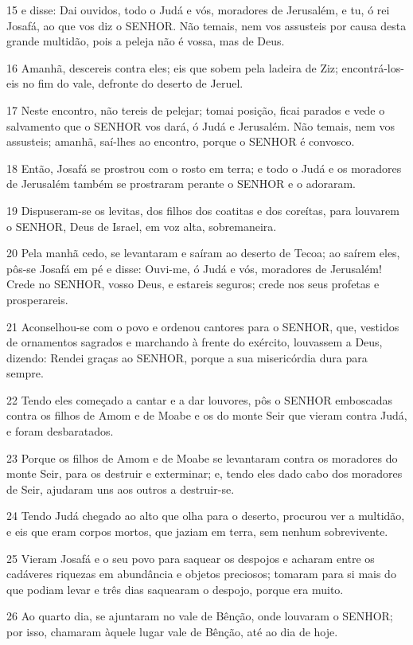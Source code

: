 \par 15 e disse: Dai ouvidos, todo o Judá e vós, moradores de Jerusalém, e tu, ó rei Josafá, ao que vos diz o SENHOR. Não temais, nem vos assusteis por causa desta grande multidão, pois a peleja não é vossa, mas de Deus.
\par 16 Amanhã, descereis contra eles; eis que sobem pela ladeira de Ziz; encontrá-los-eis no fim do vale, defronte do deserto de Jeruel.
\par 17 Neste encontro, não tereis de pelejar; tomai posição, ficai parados e vede o salvamento que o SENHOR vos dará, ó Judá e Jerusalém. Não temais, nem vos assusteis; amanhã, saí-lhes ao encontro, porque o SENHOR é convosco.
\par 18 Então, Josafá se prostrou com o rosto em terra; e todo o Judá e os moradores de Jerusalém também se prostraram perante o SENHOR e o adoraram.
\par 19 Dispuseram-se os levitas, dos filhos dos coatitas e dos coreítas, para louvarem o SENHOR, Deus de Israel, em voz alta, sobremaneira.
\par 20 Pela manhã cedo, se levantaram e saíram ao deserto de Tecoa; ao saírem eles, pôs-se Josafá em pé e disse: Ouvi-me, ó Judá e vós, moradores de Jerusalém! Crede no SENHOR, vosso Deus, e estareis seguros; crede nos seus profetas e prosperareis.
\par 21 Aconselhou-se com o povo e ordenou cantores para o SENHOR, que, vestidos de ornamentos sagrados e marchando à frente do exército, louvassem a Deus, dizendo: Rendei graças ao SENHOR, porque a sua misericórdia dura para sempre.
\par 22 Tendo eles começado a cantar e a dar louvores, pôs o SENHOR emboscadas contra os filhos de Amom e de Moabe e os do monte Seir que vieram contra Judá, e foram desbaratados.
\par 23 Porque os filhos de Amom e de Moabe se levantaram contra os moradores do monte Seir, para os destruir e exterminar; e, tendo eles dado cabo dos moradores de Seir, ajudaram uns aos outros a destruir-se.
\par 24 Tendo Judá chegado ao alto que olha para o deserto, procurou ver a multidão, e eis que eram corpos mortos, que jaziam em terra, sem nenhum sobrevivente.
\par 25 Vieram Josafá e o seu povo para saquear os despojos e acharam entre os cadáveres riquezas em abundância e objetos preciosos; tomaram para si mais do que podiam levar e três dias saquearam o despojo, porque era muito.
\par 26 Ao quarto dia, se ajuntaram no vale de Bênção, onde louvaram o SENHOR; por isso, chamaram àquele lugar vale de Bênção, até ao dia de hoje.
